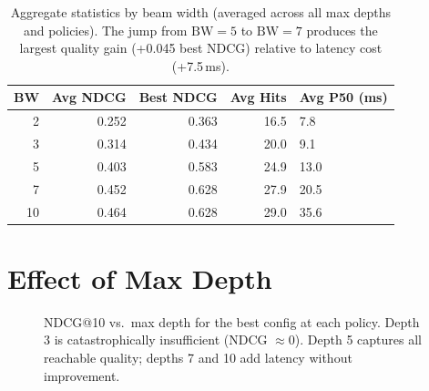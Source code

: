 \documentclass[11pt,a4paper]{article}
\begin{document}
\begin{table}[h]
\centering
\footnotesize
\begin{tabular}{rrrrl}
\toprule
\textbf{BW} & \textbf{Avg NDCG} & \textbf{Best NDCG} & \textbf{Avg Hits} & \textbf{Avg P50 (ms)} \\
\midrule
2  & 0.252 & 0.363 & 16.5 & 7.8 \\
3  & 0.314 & 0.434 & 20.0 & 9.1 \\
5  & 0.403 & 0.583 & 24.9 & 13.0 \\
7  & 0.452 & 0.628 & 27.9 & 20.5 \\
10 & 0.464 & 0.628 & 29.0 & 35.6 \\
\bottomrule
\end{tabular}
\caption{Aggregate statistics by beam width (averaged across all max depths and policies). The jump from $\mathrm{BW}=5$ to $\mathrm{BW}=7$ produces the largest quality gain (+0.045 best NDCG) relative to latency cost (+7.5\,ms).}
\end{table}

\section{Effect of Max Depth}

\begin{figure}[h]
\centering
{}
\caption{NDCG@10 vs.\ max depth for the best config at each policy. Depth 3 is catastrophically insufficient (NDCG $\approx 0$). Depth 5 captures all reachable quality; depths 7 and 10 add latency without improvement.}
\end{figure}
\end{document}
